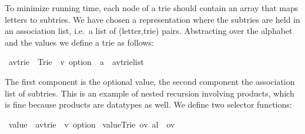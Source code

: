%
\begin{isabellebody}%
\def\isabellecontext{Trie}%
%
\isadelimtheory
%
\endisadelimtheory
%
\isatagtheory
%
\endisatagtheory
{\isafoldtheory}%
%
\isadelimtheory
%
\endisadelimtheory
%
\begin{isamarkuptext}%
To minimize running time, each node of a trie should contain an array that maps
letters to subtries. We have chosen a
representation where the subtries are held in an association list, i.e.\ a
list of (letter,trie) pairs.  Abstracting over the alphabet  and the
values  we define a trie as follows:%
\end{isamarkuptext}%
\isamarkuptrue%
\isamarkupfalse%
\ {}{}a{}{}v{}trie\ {}\ Trie\ \ {}{}v\ option{}\ \ {}{}{}a\ {}\ {}{}a{}{}v{}trie{}list{}%
\begin{isamarkuptext}%
\noindent
{}%
The first component is the optional value, the second component the
association list of subtries.  This is an example of nested recursion involving products,
which is fine because products are datatypes as well.
We define two selector functions:%
\end{isamarkuptext}%
\isamarkuptrue%
\isamarkupfalse%
\ {}value{}\ {}{}\ {}{}{}a{}{}v{}trie\ {}\ {}v\ option{}\ \isanewline
{}value{}Trie\ ov\ al{}\ {}\ ov{}\isanewline

\end{isabellebody}
